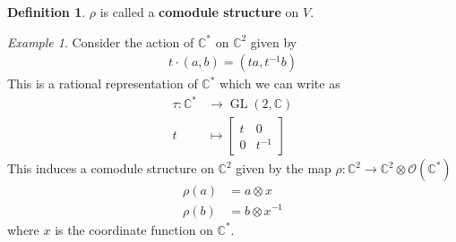 \documentclass[manuscript, printscheme]{aomart}
\theoremstyle{plain} %
\theoremstyle{definition}
\newtheorem{definition}[equation]{Definition}
\theoremstyle{remark}
\newtheorem{example}[equation]{Example}
\DeclareMathOperator{\GL}{GL}
\newcommand{\C}{\mathbb{C}}
\newcommand{\inv}[1]{{#1}^{-1}}
\newcommand{\mc}[1]{\mathcal{#1}}
\begin{document}
\begin{definition}
	$\rho$ is called a \textbf{comodule structure} on $V$.
\end{definition}

\begin{example}
	Consider the action of $\C^*$ on $\C^2$ given by
	\begin{align*}
		t\cdot (a,b) = (ta, t^{-1}b)
	\end{align*} This is a rational representation of $\C^*$ which we can write as
	\begin{align*}
		\tau:\C^* & \to \GL(2,\C)          \\
		t            & \mapsto \begin{bmatrix}
			                       t & 0       \\
			                       0 & \inv{t}
		                       \end{bmatrix}
	\end{align*} This induces a comodule structure on $\C^2$ given by the map $\rho: \C^2\to \C^2\otimes \mc O(\C^*)$ 
	\begin{align*}
		\rho(a) & = a\otimes x       \\
		\rho(b) & = b\otimes \inv{x}
	\end{align*} where $x$ is the coordinate function on $\C^*$.
\end{example}
\end{document}
